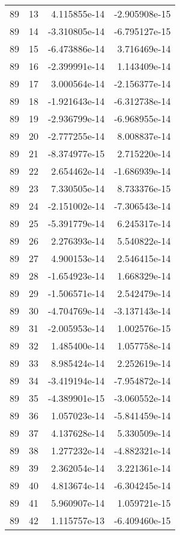 \begin{tabular}{rrrr}
  89 &   13 &  4.115855e-14 & -2.905908e-15 \\
  89 &   14 & -3.310805e-14 & -6.795127e-15 \\
  89 &   15 & -6.473886e-14 &  3.716469e-14 \\
  89 &   16 & -2.399991e-14 &  1.143409e-14 \\
  89 &   17 &  3.000564e-14 & -2.156377e-14 \\
  89 &   18 & -1.921643e-14 & -6.312738e-14 \\
  89 &   19 & -2.936799e-14 & -6.968955e-14 \\
  89 &   20 & -2.777255e-14 &  8.008837e-14 \\
  89 &   21 & -8.374977e-15 &  2.715220e-14 \\
  89 &   22 &  2.654462e-14 & -1.686939e-14 \\
  89 &   23 &  7.330505e-14 &  8.733376e-15 \\
  89 &   24 & -2.151002e-14 & -7.306543e-14 \\
  89 &   25 & -5.391779e-14 &  6.245317e-14 \\
  89 &   26 &  2.276393e-14 &  5.540822e-14 \\
  89 &   27 &  4.900153e-14 &  2.546415e-14 \\
  89 &   28 & -1.654923e-14 &  1.668329e-14 \\
  89 &   29 & -1.506571e-14 &  2.542479e-14 \\
  89 &   30 & -4.704769e-14 & -3.137143e-14 \\
  89 &   31 & -2.005953e-14 &  1.002576e-15 \\
  89 &   32 &  1.485400e-14 &  1.057758e-14 \\
  89 &   33 &  8.985424e-14 &  2.252619e-14 \\
  89 &   34 & -3.419194e-14 & -7.954872e-14 \\
  89 &   35 & -4.389901e-15 & -3.060552e-14 \\
  89 &   36 &  1.057023e-14 & -5.841459e-14 \\
  89 &   37 &  4.137628e-14 &  5.330509e-14 \\
  89 &   38 &  1.277232e-14 & -4.882321e-14 \\
  89 &   39 &  2.362054e-14 &  3.221361e-14 \\
  89 &   40 &  4.813674e-14 & -6.304245e-14 \\
  89 &   41 &  5.960907e-14 &  1.059721e-15 \\
  89 &   42 &  1.115757e-13 & -6.409460e-15 \\

\end{tabular}
